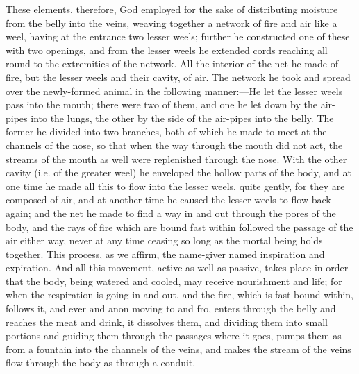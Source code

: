 These elements, therefore, God employed for the sake of distributing
moisture from the belly into the veins, weaving together a network of fire
and air like a weel, having at the entrance two lesser weels; further he
constructed one of these with two openings, and from the lesser weels he
extended cords reaching all round to the extremities of the network. All
the interior of the net he made of fire, but the lesser weels and their
cavity, of air. The network he took and spread over the newly-formed
animal in the following manner:—He let the lesser weels pass into
the mouth; there were two of them, and one he let down by the air-pipes
into the lungs, the other by the side of the air-pipes into the belly. The
former he divided into two branches, both of which he made to meet at the
channels of the nose, so that when the way through the mouth did not act,
the streams of the mouth as well were replenished through the nose. With
the other cavity (i.e. of the greater weel) he enveloped the hollow parts
of the body, and at one time he made all this to flow into the lesser
weels, quite gently, for they are composed of air, and at another time he
caused the lesser weels to flow back again; and the net he made to find a
way in and out through the pores of the body, and the rays of fire which
are bound fast within followed the passage of the air either way, never at
any time ceasing so long as the mortal being holds together. This process,
as we affirm, the name-giver named inspiration and expiration. And all
this movement, active as well as passive, takes place in order that the
body, being watered and cooled, may receive nourishment and life; for when
the respiration is going in and out, and the fire, which is fast bound
within, follows it, and ever and anon moving to and fro, enters through
the belly and reaches the meat and drink, it dissolves them, and dividing
them into small portions and guiding them through the passages where it
goes, pumps them as from a fountain into the channels of the veins, and
makes the stream of the veins flow through the body as through a conduit.

